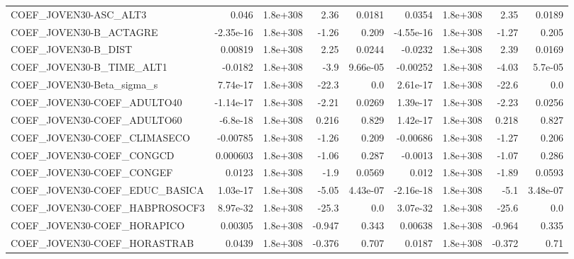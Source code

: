 \begin{tabular}{lrrrrrrrr}
COEF\_JOVEN30-ASC\_ALT3             &       0.046 &     1.8e+308 &      2.36 &   0.0181 &     0.0354 &    1.8e+308 &         2.35 &        0.0189 \\
COEF\_JOVEN30-B\_ACTAGRE            &   -2.35e-16 &     1.8e+308 &     -1.26 &    0.209 &  -4.55e-16 &    1.8e+308 &        -1.27 &         0.205 \\
COEF\_JOVEN30-B\_DIST               &     0.00819 &     1.8e+308 &      2.25 &   0.0244 &    -0.0232 &    1.8e+308 &         2.39 &        0.0169 \\
COEF\_JOVEN30-B\_TIME\_ALT1          &     -0.0182 &     1.8e+308 &      -3.9 & 9.66e-05 &   -0.00252 &    1.8e+308 &        -4.03 &       5.7e-05 \\
COEF\_JOVEN30-Beta\_sigma\_s         &    7.74e-17 &     1.8e+308 &     -22.3 &      0.0 &   2.61e-17 &    1.8e+308 &        -22.6 &           0.0 \\
COEF\_JOVEN30-COEF\_ADULTO40        &   -1.14e-17 &     1.8e+308 &     -2.21 &   0.0269 &   1.39e-17 &    1.8e+308 &        -2.23 &        0.0256 \\
COEF\_JOVEN30-COEF\_ADULTO60        &    -6.8e-18 &     1.8e+308 &     0.216 &    0.829 &   1.42e-17 &    1.8e+308 &        0.218 &         0.827 \\
COEF\_JOVEN30-COEF\_CLIMASECO       &    -0.00785 &     1.8e+308 &     -1.26 &    0.209 &   -0.00686 &    1.8e+308 &        -1.27 &         0.206 \\
COEF\_JOVEN30-COEF\_CONGCD          &    0.000603 &     1.8e+308 &     -1.06 &    0.287 &    -0.0013 &    1.8e+308 &        -1.07 &         0.286 \\
COEF\_JOVEN30-COEF\_CONGEF          &      0.0123 &     1.8e+308 &      -1.9 &   0.0569 &      0.012 &    1.8e+308 &        -1.89 &        0.0593 \\
COEF\_JOVEN30-COEF\_EDUC\_BASICA     &    1.03e-17 &     1.8e+308 &     -5.05 & 4.43e-07 &  -2.16e-18 &    1.8e+308 &         -5.1 &      3.48e-07 \\
COEF\_JOVEN30-COEF\_HABPROSOCF3     &    8.97e-32 &     1.8e+308 &     -25.3 &      0.0 &   3.07e-32 &    1.8e+308 &        -25.6 &           0.0 \\
COEF\_JOVEN30-COEF\_HORAPICO        &     0.00305 &     1.8e+308 &    -0.947 &    0.343 &    0.00638 &    1.8e+308 &       -0.964 &         0.335 \\
COEF\_JOVEN30-COEF\_HORASTRAB       &      0.0439 &     1.8e+308 &    -0.376 &    0.707 &     0.0187 &    1.8e+308 &       -0.372 &          0.71 \\

\end{tabular}
